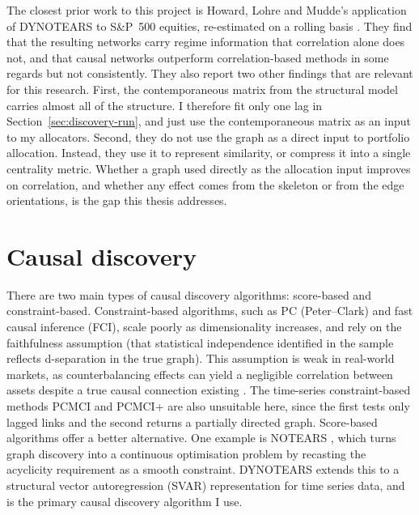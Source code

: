 \documentclass[11pt, a4paper]{report}
\begin{document}
The closest prior work to this project is Howard, Lohre and Mudde's application of DYNOTEARS to S\&P~500 equities, re-estimated on a rolling basis \cite{howard2025causal}.
They find that the resulting networks carry regime information that correlation alone does not, and that causal networks outperform correlation-based methods in some regards but not consistently. They also report two other findings that are relevant for this research.
First, the contemporaneous matrix from the structural model carries almost all of the structure. I therefore fit only one lag in Section~\ref{sec:discovery-run}, and just use the contemporaneous matrix as an input to my allocators.
Second, they do not use the graph as a direct input to portfolio allocation. Instead, they use it to represent similarity, or compress it into a single centrality metric. Whether a graph used directly as the allocation input improves on correlation, and whether any effect comes from the skeleton or from the edge orientations, is the gap this thesis addresses.

\section{Causal discovery}
\label{sec:causal-discovery}

There are two main types of causal discovery algorithms: score-based and constraint-based. Constraint-based algorithms, such as PC (Peter--Clark) and fast causal inference (FCI), scale poorly as dimensionality increases, and rely on the faithfulness assumption (that statistical independence identified in the sample reflects d-separation in the true graph). This assumption is weak in real-world markets, as counterbalancing effects can yield a negligible correlation between assets despite a true causal connection existing \cite{howard2025causal}. The time-series constraint-based methods PCMCI and PCMCI+ \cite{runge2019pcmci,runge2020pcmciplus} are also unsuitable here, since the first tests only lagged links and the second returns a partially directed graph.
Score-based algorithms offer a better alternative. One example is NOTEARS \cite{zheng2018notears}, which turns graph discovery into a continuous optimisation problem by recasting the acyclicity requirement as a smooth constraint. DYNOTEARS \cite{pamfil2020dynotears} extends this to a structural vector autoregression (SVAR) representation for time series data, and is the primary causal discovery algorithm I use.
\end{document}
